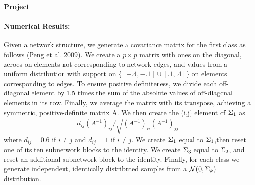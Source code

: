 \documentclass[12pt, leqno]{article}
\def\s{\ensuremath\Sigma}
\begin{document}
\pagestyle{fancy}

\begin{center}
{\large {\bf Project}} \\
\end{center}

\paragraph{Numerical Results:} 
Given a network structure, we generate a covariance matrix for the
first class as follows (Peng et al. 2009). We create a $p \times p$ matrix with
ones on the diagonal, zeroes on elements not corresponding to network
edges, and values from a uniform distribution with support on
$\{[-.4,-.1]\cup[.1,.4]\}$ on elements corresponding to edges. To
ensure positive definiteness, we divide each off-diagonal element by
1.5 times the sum of the absolute values of off-diagonal elements in
its row. Finally, we average the matrix with its transpose, achieving
a symmetric, positive-definite matrix A. We then create the (i,j)
element of $\s_1$ as
\[
d_{ij}(A^{-1})_{ij}/\sqrt{(A^{-1})_{ii}(A^{-1})_{jj}}
\]
where $d_{ij} =0.6$ if $i\not=j$ and $d_{ij} =1$ if $i\not=j$. We
create $\s_1$ equal to $\s_1$,then reset one of its ten subnetwork
blocks to the identity. 
We create $\s_3$ equal to $\s_2$, and reset an additional subnetwork
block to the identity. Finally, for each class we generate
independent, identically distributed samples from a
$\mathcal{N}(0,\s_k)$ distribution.
\end{document}

